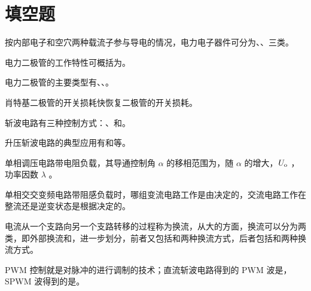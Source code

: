 \documentclass[电力电子]{subfiles}
\begin{document}
\section{填空题}
\begin{ti}
	按内部电子和空穴两种载流子参与导电的情况，电力电子器件可分为、、三类。
\end{ti}

\begin{ti}
	电力二极管的工作特性可概括为。
\end{ti}

\begin{ti}
	电力二极管的主要类型有、、。
\end{ti}

\begin{ti}
	肖特基二极管的开关损耗快恢复二极管的开关损耗。
\end{ti}

\begin{ti}
	斩波电路有三种控制方式：、和。
\end{ti}

\begin{ti}
	升压斩波电路的典型应用有和等。
\end{ti}

\begin{ti}
	单相调压电路带电阻负载，其导通控制角 $\alpha$ 的移相范围为，随 $\alpha$ 的增大，$U_{\mathrm{o}}$ ，功率因数 $\lambda$ 。
\end{ti}

\begin{ti}
	单相交交变频电路带阻感负载时，哪组变流电路工作是由决定的，交流电路工作在整流还是逆变状态是根据决定的。
\end{ti}

\begin{ti}
	电流从一个支路向另一个支路转移的过程称为换流，从大的方面，换流可以分为两类，即外部换流和，进一步划分，前者又包括和两种换流方式，后者包括和两种换流方式。
\end{ti}

\begin{ti}
	PWM 控制就是对脉冲的进行调制的技术；直流斩波电路得到的 PWM 波是，SPWM 波得到的是。
\end{ti}
\end{document}

